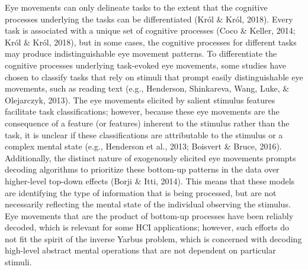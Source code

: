 \documentclass[
  english,
  man, donotrepeattitle,floatsintext]{apa6}
\begin{document}
Eye movements can only delineate tasks to the extent that the cognitive processes underlying the tasks can be differentiated (Król \& Król, 2018). Every task is associated with a unique set of cognitive processes (Coco \& Keller, 2014; Król \& Król, 2018), but in some cases, the cognitive processes for different tasks may produce indistinguishable eye movement patterns. To differentiate the cognitive processes underlying task-evoked eye movements, some studies have chosen to classify tasks that rely on stimuli that prompt easily distinguishable eye movements, such as reading text (e.g., Henderson, Shinkareva, Wang, Luke, \& Olejarczyk, 2013). The eye movements elicited by salient stimulus features facilitate task classifications; however, because these eye movements are the consequence of a feature (or features) inherent to the stimulus rather than the task, it is unclear if these classifications are attributable to the stimulus or a complex mental state (e.g., Henderson et al., 2013; Boisvert \& Bruce, 2016). Additionally, the distinct nature of exogenously elicited eye movements prompts decoding algorithms to prioritize these bottom-up patterns in the data over higher-level top-down effects (Borji \& Itti, 2014). This means that these models are identifying the type of information that is being processed, but are not necessarily reflecting the mental state of the individual observing the stimulus. Eye movements that are the product of bottom-up processes have been reliably decoded, which is relevant for some HCI applications; however, such efforts do not fit the spirit of the inverse Yarbus problem, which is concerned with decoding high-level abstract mental operations that are not dependent on particular stimuli.
\end{document}
